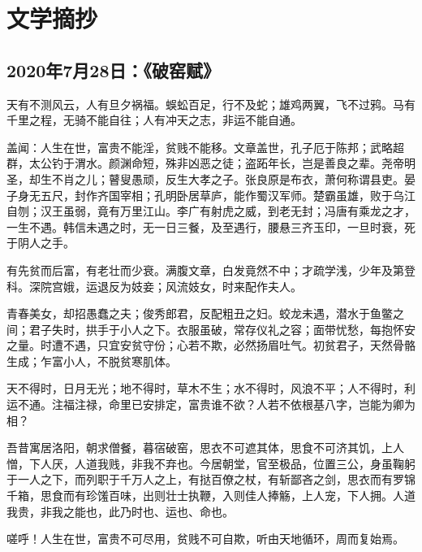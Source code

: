 \section{文学摘抄}
\subsection{2020年7月28日：《破窑赋》}

    天有不测风云，人有旦夕祸福。蜈蚣百足，行不及蛇；雄鸡两翼，飞不过鸦。马有千里之程，无骑不能自往；人有冲天之志，非运不能自通。

    盖闻：人生在世，富贵不能淫，贫贱不能移。文章盖世，孔子厄于陈邦；武略超群，太公钓于渭水。颜渊命短，殊非凶恶之徒；盗跖年长，岂是善良之辈。尧帝明圣，却生不肖之儿；瞽叟愚顽，反生大孝之子。张良原是布衣，萧何称谓县吏。晏子身无五尺，封作齐国宰相；孔明卧居草庐，能作蜀汉军师。楚霸虽雄，败于乌江自刎；汉王虽弱，竟有万里江山。李广有射虎之威，到老无封；冯唐有乘龙之才，一生不遇。韩信未遇之时，无一日三餐，及至遇行，腰悬三齐玉印，一旦时衰，死于阴人之手。

    有先贫而后富，有老壮而少衰。满腹文章，白发竟然不中；才疏学浅，少年及第登科。深院宫娥，运退反为妓妾；风流妓女，时来配作夫人。

    青春美女，却招愚蠢之夫；俊秀郎君，反配粗丑之妇。蛟龙未遇，潜水于鱼鳖之间；君子失时，拱手于小人之下。衣服虽破，常存仪礼之容；面带忧愁，每抱怀安之量。时遭不遇，只宜安贫守份；心若不欺，必然扬眉吐气。初贫君子，天然骨骼生成；乍富小人，不脱贫寒肌体。

    天不得时，日月无光；地不得时，草木不生；水不得时，风浪不平；人不得时，利运不通。注福注禄，命里已安排定，富贵谁不欲？人若不依根基八字，岂能为卿为相？

    吾昔寓居洛阳，朝求僧餐，暮宿破窑，思衣不可遮其体，思食不可济其饥，上人憎，下人厌，人道我贱，非我不弃也。今居朝堂，官至极品，位置三公，身虽鞠躬于一人之下，而列职于千万人之上，有挞百僚之杖，有斩鄙吝之剑，思衣而有罗锦千箱，思食而有珍馐百味，出则壮士执鞭，入则佳人捧觞，上人宠，下人拥。人道我贵，非我之能也，此乃时也、运也、命也。

    嗟呼！人生在世，富贵不可尽用，贫贱不可自欺，听由天地循环，周而复始焉。

